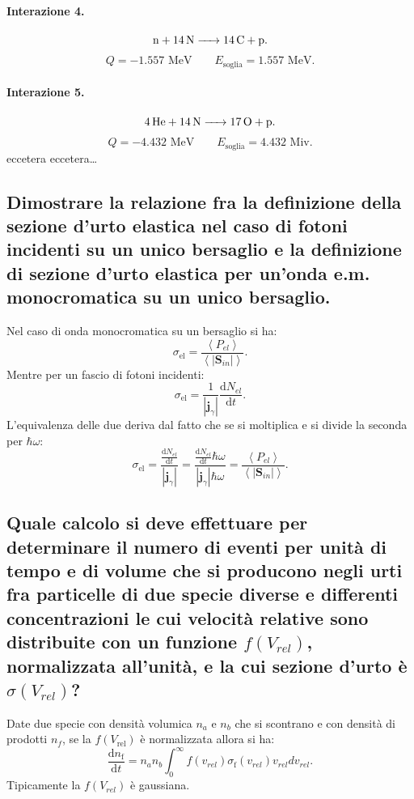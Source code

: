 \paragraph{Interazione 4.}%
\[
	\ce{n + 14N -> 14C + p}
.\] 
\[
	Q = -1.557 \text{ MeV} \quad \quad E_{\text{soglia}}=1.557 \text{ MeV}
.\] 
\paragraph{Interazione 5.}%
\[
	\ce{4He + 14N -> 17O + p}
.\] 
\[
	Q =-4.432  \text{ MeV} \quad \quad E_{\text{soglia}}=4.432 \text{ Miv}
.\] 
eccetera eccetera\ldots
\subsection[ Equivalenza tra sezione d'urto elastica con fotoni incidenti o onda monocromatica incidente]{Dimostrare la relazione fra la definizione della sezione d’urto elastica nel caso di fotoni incidenti su un unico bersaglio e la definizione di sezione d'urto elastica per un’onda e.m. monocromatica su un unico bersaglio.}
Nel caso di onda monocromatica su un bersaglio si ha:
\[
	\sigma_{\text{el}} = \frac{\left< P_{el}\right>}{\left<\left| \boldsymbol{S}_{in} \right|  \right>}
.\]
Mentre per un fascio di fotoni incidenti:
\[
	\sigma_{\text{el}} = \frac{1}{\left| \boldsymbol{j}_{\gamma}\right|}\frac{\mbox{d} N_{el}}{\mbox{d} t}
.\] 
L'equivalenza delle due deriva dal fatto che se si moltiplica e si divide la seconda per $ \hbar \omega$:
\[
	\sigma_{\text{el}} = \frac{\frac{\mbox{d} N_{el}}{\mbox{d} t}}{\left| \boldsymbol{j}_{\gamma}\right|} = \frac{\frac{\mbox{d} N_{el}}{\mbox{d} t}\hbar \omega }{\left| \boldsymbol{j}_{\gamma}\right|\hbar \omega} = \frac{\left< P_{el}\right>}{\left<\left| \boldsymbol{S}_{in} \right|  \right>}
.\] 	

\subsection[ Numero di eventi su volume e tempo negli urti tra particelle con $v_{\text{rel}}$ distribuita con $f\left( v_{\text{rel}} \right) $]{Quale calcolo si deve effettuare per determinare il numero di eventi per unità di tempo e di volume che si producono negli urti fra particelle di due specie diverse e differenti concentrazioni le cui velocità relative sono distribuite con un funzione $f(V_{rel})$, normalizzata all'unità, e la cui sezione d'urto è $\sigma(V_{rel})$?}
Date due specie con densità volumica $n_a$ e  $n_b$ che si scontrano e con densità di prodotti $n_f$, se la $ f\left( V_{\text{rel}} \right) $ è normalizzata allora si ha:
\[
	\frac{\mbox{d} n_{\text{f}}}{\mbox{d} t } = n_a n_b \int_0^{\infty} f\left( v_{rel} \right) \sigma_{\text{f}}\left( v_{rel} \right) v_{rel} dv_{rel}
.\] 
Tipicamente la $f\left( V_{rel} \right)$ è gaussiana. 

